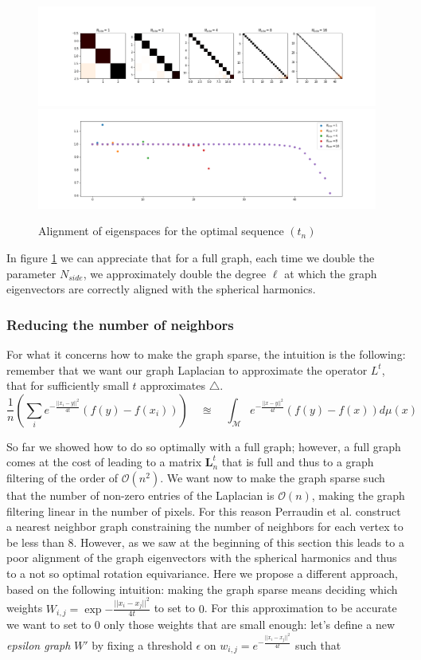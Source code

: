 \begin{figure}[h]
	\centering
	\includegraphics[width=\textwidth]{../codes/02.HeatKernelGraphLaplacian/HEALPix/06_figures/optimal_full.png}	
	\includegraphics[width=\textwidth]{../codes/02.HeatKernelGraphLaplacian/HEALPix/06_figures/optimal_full_diagonal.png}
\caption{\label{fig:optimal graph}Alignment of eigenspaces for the optimal sequence $(t_n)$}
\end{figure}
In figure \ref{fig:optimal graph} we can appreciate that for a full graph, each time we double the parameter $N_{side}$, we approximately double the degree $\ell$ at which the graph eigenvectors are correctly aligned with the spherical harmonics.
\subsubsection{Reducing the number of neighbors}
For what it concerns how to make the graph sparse, the intuition is the following: remember that we want our graph Laplacian to approximate the operator $L^t$, that for sufficiently small $t$ approximates $\triangle$.
$$\frac{1}{n}\left(\sum_i e^{-\frac{||x_i-y||^2}{4t}}(f(y)-f(x_i)) \right) \quad \approxeq \quad \int_\mathcal M e^{-\frac{||x-y||^2}{4t}}\left(f(y)-f(x)\right)d\mu(x) $$

So far we showed how to do so optimally with a full graph; however, a full graph comes at the cost of leading to a matrix $\mathbf L_n^t$ that is full and thus to a graph filtering of the order of $\mathcal O(n^2)$. We want now to make the graph sparse such that the number of non-zero entries of the Laplacian is $\mathcal O (n)$, making the graph filtering linear in the number of pixels. For this reason Perraudin et al. \cite{DeepSphere} construct a nearest neighbor graph constraining the number of neighbors for each vertex to be less than 8. However, as we saw at the beginning of this section this leads to a poor alignment of the graph eigenvectors with the spherical harmonics and thus to a not so optimal rotation equivariance. Here we propose a different approach, based on the following intuition: making the graph sparse means deciding which weights $W_{i,j}=\exp{-\frac{||x_i-x_j||^2}{4t}}$ to set to $0$. For this approximation to be accurate we want to set to 0 only those weights that are small enough: let's define a new \textit{epsilon graph} $W'$ by fixing a threshold $\epsilon$ on $w_{i,j}=e^{-\frac{||x_i-x_j||^2}{4t}}$ such that

